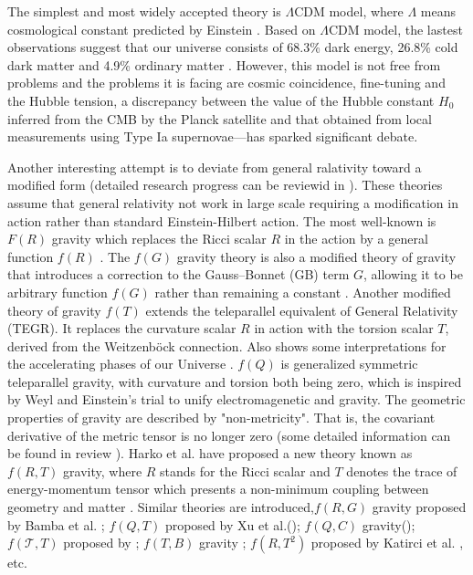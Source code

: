 \documentclass[a4paper,fleqn]{cas-sc}
\begin{document}
The simplest and most widely accepted theory is $\Lambda \text{CDM}$ model, where $\Lambda$ means cosmological constant predicted by Einstein \cite{Carroll_2001}.
Based on $\Lambda \text{CDM}$ model, the lastest observations suggest that our universe consists of 68.3\% dark energy, 26.8\% cold dark matter and 4.9\% ordinary matter \cite{2020Planck}. However, this model is not free from problems and the problems it is facing are cosmic coincidence, fine-tuning and the Hubble tension, a discrepancy between the value of the Hubble constant $H_0$ inferred from the CMB by the Planck satellite and that obtained from local measurements using Type Ia supernovae—has sparked significant debate. 

Another interesting attempt is to deviate from general ralativity toward a modified form (detailed research progress can be reviewid in \cite{Clifton_2012}). These theories assume that general relativity not work in large scale requiring a modification in action rather than standard Einstein-Hilbert action. The most well-known is $F(R)$ gravity which replaces the Ricci scalar $R$ in the action by a general function $f(R)$ \cite{1970MNRAS.150....1B}. The $f(G)$ gravity theory is also a modified theory of gravity that introduces a correction to the Gauss–Bonnet (GB) term $G$, allowing it to be arbitrary function $f(G)$ rather than remaining a constant \cite{NOJIRI20051,NOJIRI_2007}. Another modified theory of gravity $f(T)$ extends the teleparallel equivalent of General Relativity (TEGR). It replaces the curvature scalar $R$ in action with the torsion scalar $T$, derived from the Weitzenböck connection. Also shows some interpretations for the accelerating phases of our Universe \cite{Cai_2016,Bengochea_2009}. $f(Q)$ is generalized symmetric teleparallel gravity, with curvature and torsion both being zero, which is inspired by Weyl and Einstein's trial to unify electromagenetic and gravity. The geometric properties of gravity are described by "non-metricity". That is, the covariant derivative of the metric tensor is no longer zero (some detailed information can be found in review \cite{HEISENBERG20241}). Harko et al. have proposed a new theory known as $f (R, T )$ gravity, where $R$ stands for the Ricci scalar and $T$ denotes the trace of energy-momentum tensor which presents a non-minimum coupling between geometry and matter \cite{PhysRevD.84.024020}. Similar theories are introduced,$f(R,G)$ gravity proposed by Bamba et al. \cite{Bamba2009FinitetimeFS}; $f(Q,T)$ proposed by Xu et al.(\cite{Xu_2019}); $f(Q,C)$ gravity(\cite{De_2024}); $f(\mathcal{T},T)$ proposed by \cite{Harko_2014}; $f(T,B)$ gravity \cite{Bahamonde_2015,Bahamonde_2017}; $f(R,T^2)$ proposed by Katirci et al. \cite{Kat_rc__2014}, etc.
\end{document}
